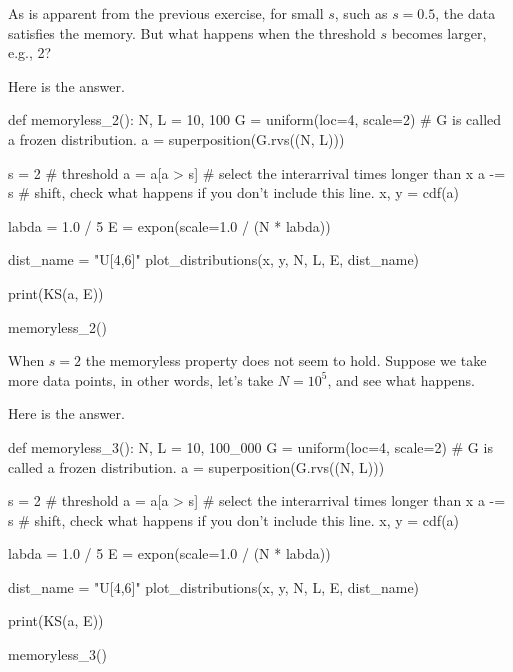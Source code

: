\begin{exercise}
  As is apparent from the previous exercise, for small $s$, such as $s=0.5$, the data satisfies the memory.
But   what happens when  the threshold $s$ becomes larger, e.g., 2?
  \begin{solution}
Here is the answer.
\begin{pyverbatim}
def memoryless_2():
    N, L = 10, 100
    G = uniform(loc=4, scale=2)  # G is called a frozen distribution.
    a = superposition(G.rvs((N, L)))

    s = 2  # threshold
    a = a[a > s]  # select the interarrival times longer than x
    a -= s  # shift, check what happens if you don't include this line.
    x, y = cdf(a)

    labda = 1.0 / 5
    E = expon(scale=1.0 / (N * labda))

    dist_name = "U[4,6]"
    plot_distributions(x, y, N, L, E, dist_name)

    print(KS(a, E))


memoryless_2()
\end{pyverbatim}
  \end{solution}
\end{exercise}

\begin{exercise}
When $s=2$ the memoryless property does not seem to hold. Suppose we take more data points, in other words, let's take $N=10^5$, and see what happens.
  \begin{solution}
Here is the answer.
\begin{pyverbatim}
def memoryless_3():
    N, L = 10, 100_000
    G = uniform(loc=4, scale=2)  # G is called a frozen distribution.
    a = superposition(G.rvs((N, L)))

    s = 2  # threshold
    a = a[a > s]  # select the interarrival times longer than x
    a -= s  # shift, check what happens if you don't include this line.
    x, y = cdf(a)

    labda = 1.0 / 5
    E = expon(scale=1.0 / (N * labda))

    dist_name = "U[4,6]"
    plot_distributions(x, y, N, L, E, dist_name)

    print(KS(a, E))


memoryless_3()
\end{pyverbatim}
  \end{solution}
\end{exercise}


